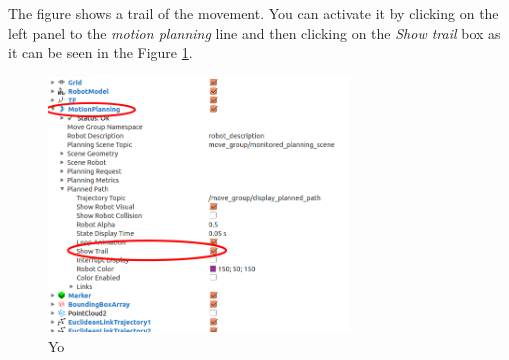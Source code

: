 The figure shows a trail of the movement. You can activate it by clicking on the left panel to the \emph{motion planning} line and then clicking on the \emph{Show trail} box as it can be seen in the Figure \ref{fig:show_trail}.  


\begin{figure}
\includegraphics[width=8cm]{images/utilisation/show_trail.png}
\centering
\caption{Yo}
\label{fig:show_trail}
\end{figure}